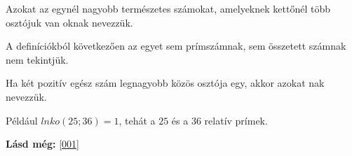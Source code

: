 \begin{defin}
Azokat az egynél nagyobb természetes számokat, amelyeknek kettőnél több
osztójuk van oknak nevezzük.
\end{defin}

\begin{corollary}
A definíciókból következően az egyet sem prímszámnak, sem összetett számnak nem
tekintjük.
\end{corollary}

\begin{defin}
Ha két pozitív egész szám legnagyobb közös osztója egy, akkor azokat
nak nevezzük.

Például $lnko(25; 36) = 1$, tehát a $25$ és a $36$ relatív prímek.
\end{defin}

\textbf{Lásd még:} \ref{001}
